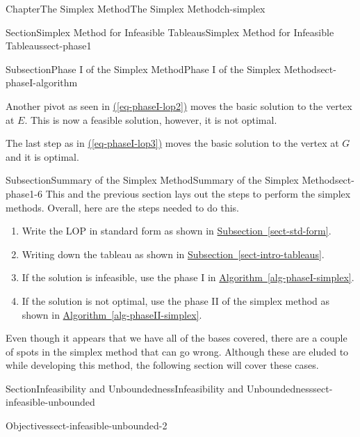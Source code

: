 \documentclass[oneside,10pt,]{book}
\newcommand{\xreffont}{\relax}
\numberwithin{equation}{section}
\begin{document}
\begin{chapterptx}{Chapter}{The Simplex Method}{}{The Simplex Method}{}{}{ch-simplex}
\begin{sectionptx}{Section}{Simplex Method for Infeasible Tableaus}{}{Simplex Method for Infeasible Tableaus}{}{}{sect-phase1}
\begin{subsectionptx}{Subsection}{Phase I of the Simplex Method}{}{Phase I of the Simplex Method}{}{}{sect-phaseI-algorithm}
\par
Another pivot as seen in \hyperref[eq-phaseI-lop2]{({\xreffont\ref{eq-phaseI-lop2}})} moves the basic solution to the vertex at \(E\). This is now a feasible solution, however, it is not optimal.%
\par
The last step as in \hyperref[eq-phaseI-lop3]{({\xreffont\ref{eq-phaseI-lop3}})} moves the basic solution to the vertex at \(G\) and it is optimal.%
\end{subsectionptx}
%
%
\typeout{************************************************}
\typeout{************************************************}
%
\begin{subsectionptx}{Subsection}{Summary of the Simplex Method}{}{Summary of the Simplex Method}{}{}{sect-phase1-6}
This and the previous section lays out the steps to perform the simplex methods. Overall, here are the steps needed to do this.%
\par
%
\begin{enumerate}
\item{}Write the LOP in standard form as shown in \hyperref[sect-std-form]{Subsection~{\xreffont\ref{sect-std-form}}}.%
\item{}Writing down the tableau as shown in \hyperref[sect-intro-tableaus]{Subsection~{\xreffont\ref{sect-intro-tableaus}}}.%
\item{}If the solution is infeasible, use the phase I in \hyperref[alg-phaseI-simplex]{Algorithm~{\xreffont\ref{alg-phaseI-simplex}}}.%
\item{}If the solution is not optimal, use the phase II of the simplex method as shown in \hyperref[alg-phaseII-simplex]{Algorithm~{\xreffont\ref{alg-phaseII-simplex}}}.%
\end{enumerate}
%
\par
Even though it appears that we have all of the bases covered, there are a couple of spots in the simplex method that can go wrong. Although these are eluded to while developing this method, the following section will cover these cases.%
\end{subsectionptx}
\end{sectionptx}
%
%
\typeout{************************************************}
\typeout{************************************************}
%
\begin{sectionptx}{Section}{Infeasibility and Unboundedness}{}{Infeasibility and Unboundedness}{}{}{sect-infeasible-unbounded}
\begin{objectives}{Objectives}{sect-infeasible-unbounded-2}

\end{objectives}
\end{sectionptx}
\end{chapterptx}
\end{document}
